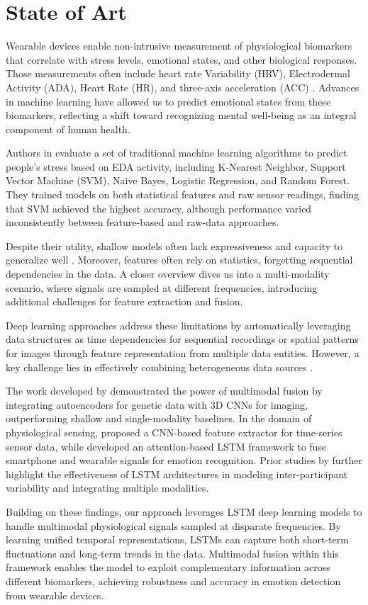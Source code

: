 \section{State of Art}
Wearable devices enable non-intrusive measurement of physiological biomarkers that correlate with stress levels, emotional states, and other biological responses. Those measurements often include heart rate Variability (HRV), Electrodermal Activity (ADA), Heart Rate (HR), and three-axis acceleration (ACC) \cite{Vos2023}. Advances in machine learning have allowed us to predict emotional states from these biomarkers, reflecting a shift toward recognizing mental well-being as an integral component of human health.

Authors in \cite{Zhu2023} evaluate a set of traditional machine learning algorithms to predict people's stress based on EDA activity, including K-Nearest Neighbor, Support Vector Machine (SVM), Naive Bayes, Logistic Regression, and Random Forest. They trained models on both statistical features and raw sensor readings, finding that SVM achieved the highest accuracy, although performance varied inconsistently between feature-based and raw-data approaches.

Despite their utility, shallow models often lack expressiveness and capacity to generalize well \cite{Yang2023}. Moreover, features often rely on statistics, forgetting sequential dependencies in the data. A closer overview dives us into a multi-modality scenario, where signals are sampled at different frequencies, introducing additional challenges for feature extraction and fusion.

Deep learning approaches address these limitations by automatically leveraging data structures as time dependencies for sequential recordings or spatial patterns for images through feature representation from multiple data entities. However, a key challenge lies in effectively combining heterogeneous data sources \cite{Baltrusaitis2019,Liang2024}. 

The work developed by \cite{Venugopalan2021} demonstrated the power of multimodal fusion by integrating autoencoders for genetic data with 3D CNNs for imaging, outperforming shallow and single‑modality baselines. In the domain of physiological sensing, \cite{Wan2020743} proposed a CNN-based feature extractor for time-series sensor data, while \cite{Yang20231082} developed an attention-based LSTM framework to fuse smartphone and wearable signals for emotion recognition. Prior studies by \cite{Zhang20211138,Li20213323} further highlight the effectiveness of LSTM architectures in modeling inter‑participant variability and integrating multiple modalities.

Building on these findings, our approach leverages LSTM deep learning models to handle multimodal physiological signals sampled at disparate frequencies. By learning unified temporal representations, LSTMs can capture both short‑term fluctuations and long‑term trends in the data. Multimodal fusion within this framework enables the model to exploit complementary information across different biomarkers, achieving robustness and accuracy in emotion detection from wearable devices.